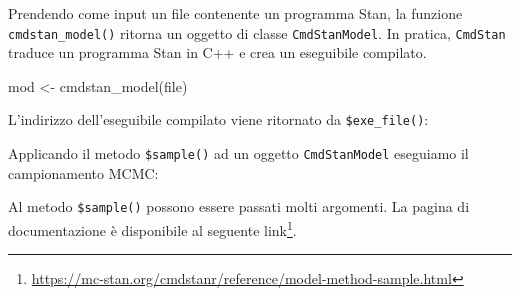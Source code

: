 \documentclass[
  11pt,
]{krantz}
\makeatletter
\newenvironment{Shaded}{\begin{snugshade}}{\end{snugshade}}
\newcommand{\AttributeTok}[1]{\textcolor[rgb]{0.61,0.61,0.61}{#1}}
\newcommand{\DecValTok}[1]{\textcolor[rgb]{0.06,0.06,0.06}{#1}}
\newcommand{\FunctionTok}[1]{\textcolor[rgb]{0,0,0}{#1}}
\newcommand{\NormalTok}[1]{#1}
\newcommand{\OtherTok}[1]{\textcolor[rgb]{0.37,0.37,0.37}{#1}}
\newcommand{\SpecialCharTok}[1]{\textcolor[rgb]{0,0,0}{#1}}
\renewcommand{\href}[2]{#2\footnote{\url{#1}}}
\newenvironment{kframe}{%
\medskip{}
\setlength{\fboxsep}{.8em}
 \def\at@end@of@kframe{}%
 \ifinner\ifhmode%
  \def\at@end@of@kframe{\end{minipage}}%
  \begin{minipage}{\columnwidth}%
 \fi\fi%
 \def\FrameCommand##1{\hskip\@totalleftmargin \hskip-\fboxsep
 \colorbox{shadecolor}{##1}\hskip-\fboxsep
     \hskip-\linewidth \hskip-\@totalleftmargin \hskip\columnwidth}%
 \MakeFramed {\advance\hsize-\width
   \@totalleftmargin\z@ \linewidth\hsize
   \@setminipage}}%
 {\par\unskip\endMakeFramed%
 \at@end@of@kframe}
\renewenvironment{Shaded}{\begin{kframe}}{\end{kframe}}
\theoremstyle{definition}
\theoremstyle{definition}
\theoremstyle{definition}
\theoremstyle{definition}
\theoremstyle{remark}
\makeatother
\begin{document}
\begin{Shaded}
\end{Shaded}

Prendendo come input un file contenente un programma Stan, la funzione \texttt{cmdstan\_model()} ritorna un oggetto di classe \texttt{CmdStanModel}. In pratica, \texttt{CmdStan} traduce un programma Stan in C++ e crea un eseguibile compilato.

\begin{Shaded}
\begin{Highlighting}[]
\NormalTok{mod }\OtherTok{\textless{}{-}} \FunctionTok{cmdstan\_model}\NormalTok{(file)}
\end{Highlighting}
\end{Shaded}

L'indirizzo dell'eseguibile compilato viene ritornato da \texttt{\$exe\_file()}:

\begin{Shaded}
\end{Shaded}

Applicando il metodo \texttt{\$sample()} ad un oggetto \texttt{CmdStanModel} eseguiamo il campionamento MCMC:

\begin{Shaded}
\end{Shaded}

Al metodo \texttt{\$sample()} possono essere passati molti argomenti. La pagina di documentazione è disponibile al seguente \href{https://mc-stan.org/cmdstanr/reference/model-method-sample.html}{link}.
\end{document}

